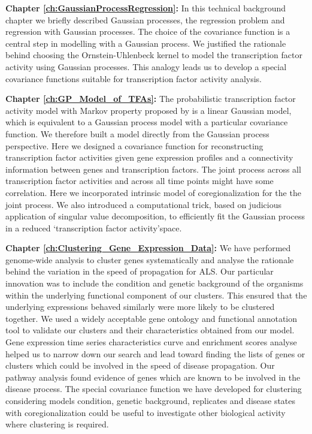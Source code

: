 \textbf{Chapter \ref{ch:GaussianProcessRegression}:} In this technical background chapter we briefly described Gaussian processes, the regression problem and regression with Gaussian processes. The choice of the covariance function is a central step in modelling with a Gaussian process. We justified the rationale behind choosing the Ornstein-Uhlenbeck kernel to model the transcription factor activity using Gaussian processes. This analogy leads us to develop a special covariance functions suitable for transcription factor activity analysis. 

\textbf{Chapter \ref{ch:GP_Model_of_TFAs}:} The probabilistic transcription factor activity model with Markov property proposed by \cite{Sanguinetti:2006} is a linear Gaussian model, which is equivalent to a Gaussian process model with a particular covariance function. We therefore built a model directly from the Gaussian process perspective. Here we designed a covariance function for reconstructing transcription factor activities given gene expression profiles and a connectivity information between genes and transcription factors. The joint process across all transcription factor activities and across all time points might have some correlation. Here we incorporated intrinsic model of coregionalization for the the joint process. We also introduced a computational trick, based on  judicious application of singular value decomposition, to efficiently fit the Gaussian process in a reduced \lq transcription factor activity\rq space. 

\textbf{Chapter \ref{ch:Clustering_Gene_Expression_Data}:} We have performed genome-wide analysis to cluster genes systematically and analyse the rationale behind the variation in the speed of propagation for ALS. Our particular innovation was to include the condition and genetic background of the organisms within the underlying functional component of our clusters. This ensured that the underlying expressions behaved similarly were more likely to be clustered together. We used a widely acceptable gene ontology and functional annotation tool to validate our clusters and their characteristics obtained from our model. Gene expression time series characteristics curve and enrichment scores analyse helped us to narrow down our search and lead toward finding the lists of genes or clusters which could be involved in the speed of disease propagation. Our pathway analysis found evidence of genes which are known to be involved in the disease process. The special covariance function we have developed for clustering considering models condition, genetic background, replicates and disease states with coregionalization could be useful to investigate other biological activity where clustering is required. 

